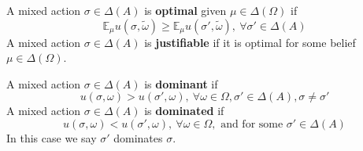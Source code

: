 \documentclass[11pt]{elegantbook_2}
\begin{document}
\begin{definition}
    A mixed action $\sigma\in\Delta(A)$ is \textbf{optimal} given $\mu\in\Delta(\Omega)$ if $$\mathbb{E}_\mu u(\sigma,\tilde{\omega})\geq \mathbb{E}_\mu u(\sigma',\tilde{\omega}),\ \forall \sigma'\in \Delta(A)$$
    A mixed action $\sigma\in\Delta(A)$ is \textbf{justifiable} if it is optimal for some belief $\mu\in\Delta(\Omega)$.
\end{definition}

\begin{definition}
    A mixed action $\sigma\in\Delta(A)$ is \textbf{dominant} if $$u(\sigma,\omega)>u(\sigma',\omega),\ \forall \omega\in \Omega, \sigma'\in \Delta(A),\sigma\neq\sigma'$$
    A mixed action $\sigma\in\Delta(A)$ is \textbf{dominated} if $$u(\sigma,\omega)<u(\sigma',\omega),\ \forall \omega\in \Omega, \text{ and for some } \sigma'\in \Delta(A)$$
    In this case we say $\sigma'$ dominates $\sigma$.
\end{definition}
\end{document}
